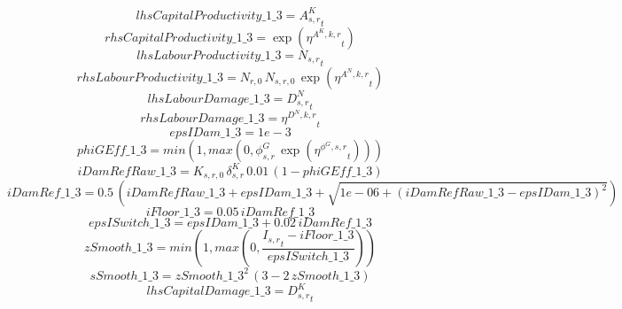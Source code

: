 \begin{dmath*}
lhsCapitalProductivity\_1\_3 = {{A^{K}_{s,r}}}_{t}
\end{dmath*}
\begin{dmath*}
rhsCapitalProductivity\_1\_3 = \exp\left({{\eta^{A^{K},k,r}}}_{t}\right)
\end{dmath*}
\begin{dmath*}
lhsLabourProductivity\_1\_3 = {{N_{s,r}}}_{t}
\end{dmath*}
\begin{dmath*}
rhsLabourProductivity\_1\_3 = {{N_{r,0}}}\, {{N_{s,r,0}}}\, \exp\left({{\eta^{A^{N},k,r}}}_{t}\right)
\end{dmath*}
\begin{dmath*}
lhsLabourDamage\_1\_3 = {{D^N_{s,r}}}_{t}
\end{dmath*}
\begin{dmath*}
rhsLabourDamage\_1\_3 = {{\eta^{D^{N},k,r}}}_{t}
\end{dmath*}
\begin{dmath*}
epsIDam\_1\_3 = 1e-3
\end{dmath*}
\begin{dmath*}
phiGEff\_1\_3 = min(1,max(0,{{\phi^{G}_{s,r}}}\, \exp\left({{\eta^{\phi^{G},s,r}}}_{t}\right)))
\end{dmath*}
\begin{dmath*}
iDamRefRaw\_1\_3 = {{K_{s,r,0}}}\, {{\delta^{K}_{s,r}}}\, 0.01\, \left(1-{phiGEff\_1\_3}\right)
\end{dmath*}
\begin{dmath*}
iDamRef\_1\_3 = 0.5\, \left({iDamRefRaw\_1\_3}+{epsIDam\_1\_3}+\sqrt{1e-06+\left({iDamRefRaw\_1\_3}-{epsIDam\_1\_3}\right)^{2}}\right)
\end{dmath*}
\begin{dmath*}
iFloor\_1\_3 = 0.05\, {iDamRef\_1\_3}
\end{dmath*}
\begin{dmath*}
epsISwitch\_1\_3 = {epsIDam\_1\_3}+0.02\, {iDamRef\_1\_3}
\end{dmath*}
\begin{dmath*}
zSmooth\_1\_3 = min(1,max(0,\frac{{{I_{s,r}}}_{t}-{iFloor\_1\_3}}{{epsISwitch\_1\_3}}))
\end{dmath*}
\begin{dmath*}
sSmooth\_1\_3 = {zSmooth\_1\_3}^{2}\, \left(3-2\, {zSmooth\_1\_3}\right)
\end{dmath*}
\begin{dmath*}
lhsCapitalDamage\_1\_3 = {{D^K_{s,r}}}_{t}
\end{dmath*}
